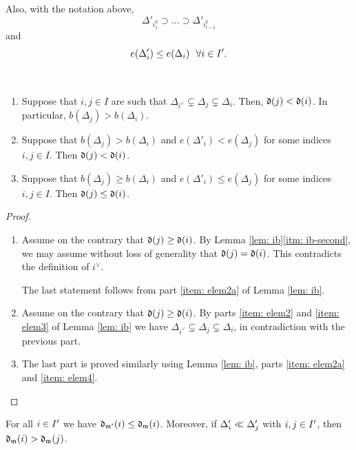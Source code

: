 \documentclass{ert-l} %
\begin{document}
Also, with the notation above,
\begin{equation} \label{eq: del'dec}
\Delta'_{i^k_1}\supset\dots\supset\Delta'_{i^k_{l-1}}
\end{equation}
and
\begin{equation} \label{eq: del'del}
e(\Delta'_i)\le e(\Delta_i)\ \ \forall i\in I'.
\end{equation}

\begin{lemma} \ \label{lem: id}
\begin{enumerate}
\item \label{itm: id1} Suppose that $i,j\in I$ are such that $\Delta_{i^\vee}\subsetneq \Delta_j\subsetneq \Delta_i$.
Then, $\mathfrak{d}(j)< \mathfrak{d}(i)$. In particular, $b(\Delta_{j})>b(\Delta_i)$.
\item \label{itm: id2} Suppose that $b(\Delta_j)>b(\Delta_i)$ and $e(\Delta'_i)<e(\Delta_j)$ for some indices $i,j\in I$.
Then $\mathfrak{d}(j)<\mathfrak{d}(i)$.
\item \label{itm: id3} Suppose that $b(\Delta_j)\ge b(\Delta_i)$ and $e(\Delta'_i)\le e(\Delta_j)$ for some indices $i,j\in I$.
Then $\mathfrak{d}(j)\le\mathfrak{d}(i)$.
\end{enumerate}
\end{lemma}

\begin{proof}
\begin{enumerate}
\item Assume on the contrary that $\mathfrak{d}(j)\ge \mathfrak{d}(i)$.
By Lemma \ref{lem: ib}\eqref{itm: ib-second}, we may assume without loss of generality that $\mathfrak{d}(j) = \mathfrak{d}(i)$.
This contradicts the definition of $i^\vee$.

The last statement follows from part \ref{item: elem2a} of Lemma \ref{lem: ib}.

\item Assume on the contrary that $\mathfrak{d}(j)\ge \mathfrak{d}(i)$.
By parts \ref{item: elem2} and \ref{item: elem3} of Lemma \ref{lem: ib} we have $\Delta_{i^\vee}\subsetneq \Delta_j\subsetneq \Delta_i$,
in contradiction with the previous part.

\item The last part is proved similarly using Lemma \ref{lem: ib}, parts \ref{item: elem2a} and \ref{item: elem4}.
\end{enumerate}
\end{proof}


\begin{corollary}\label{cor: ic}
For all $i\in I'$ we have $\mathfrak{d}_{\mathfrak{m}'}(i)\le\mathfrak{d}_{\mathfrak{m}}(i)$.
Moreover, if $\Delta'_i \ll \Delta'_j$ with $i,j\in I'$,
then $\mathfrak{d}_{\mathfrak{m}}(i)>\mathfrak{d}_{\mathfrak{m}}(j)$.
\end{corollary}
\end{document}
